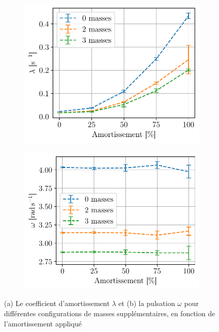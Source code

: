 \begin{figure}[h]
    \centering
    \begin{subfigure}{0.48\linewidth}
        \centering
        \includegraphics[width=\linewidth]{figures/lambda_nomot.pdf}
        \caption{}
        \label{fig:lambda_libre}
    \end{subfigure}
    \begin{subfigure}{0.48\linewidth}
        \centering
        \includegraphics[width=\linewidth]{figures/omega_nomot.pdf}
        \caption{}
        \label{fig:omega_libre}
    \end{subfigure}
    \caption{(a) Le coefficient d'amortissement \(\lambda\) et (b) la pulsation \(\omega\) pour différentes configurations de masses supplémentaires, en fonction de l'amortissement appliqué}
\end{figure}


